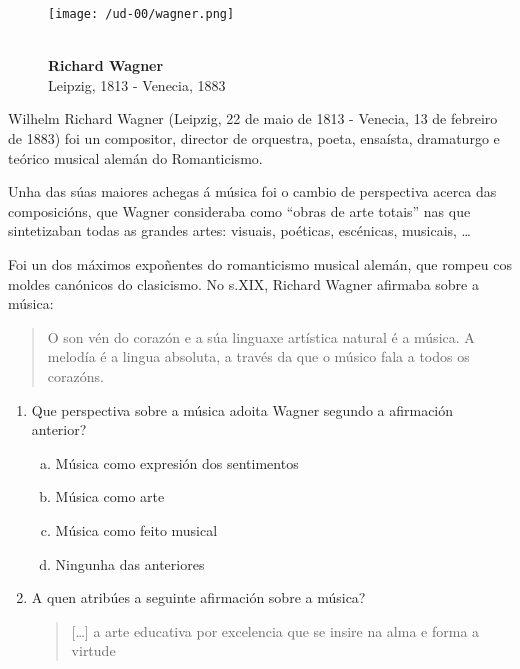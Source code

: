 \begin{ejercicio}

\begin{wrapfigure}{r}{0.30\textwidth} 
\begin{center} 
\texttt{[image: /ud-00/wagner.png]} 
\end{center} 
\caption{\\ \textbf{Richard Wagner} \\ 
Leipzig, 1813 - Venecia, 1883} 
\label{fig:descartes}
\end{wrapfigure}

Wilhelm Richard Wagner (Leipzig, 22 de maio de 1813 - Venecia, 13 de febreiro de 1883) foi un compositor, director de orquestra, poeta, ensaísta, dramaturgo e teórico musical alemán do Romanticismo.

Unha das súas maiores achegas á música foi o cambio de perspectiva acerca das composicións, que Wagner consideraba como ``obras de arte totais'' nas que sintetizaban todas as grandes artes: visuais, poéticas, escénicas, musicais, \ldots

Foi un dos máximos expoñentes do romanticismo musical alemán, que rompeu cos moldes canónicos do clasicismo. 
No s.{\scriptsize XIX}, Richard Wagner afirmaba sobre a música:

    \begin{quotation}{\small
     \noindent
     O son vén do corazón e a súa linguaxe artística natural é a música. A melodía é a lingua absoluta, a través da que o músico fala a todos os corazóns.}
    \end{quotation}
 
\begin{enumerate}[1)]
 \item \label{perspectiva-descartes}
 Que perspectiva sobre a música adoita Wagner segundo a afirmación anterior?
 \begin{enumerate}[a)]
  \item 
  Música como expresión dos sentimentos
  \item \label{sol:2}
  Música como arte
  \item 
  Música como feito musical
  \item
  Ningunha das anteriores
 \end{enumerate}
 \item \label{perpectiva-pitagoras}
 A quen atribúes a seguinte afirmación sobre a música? \dotfill
     \begin{quote}
    {%
    [\ldots] a arte educativa por excelencia que se insire na alma e forma a virtude
    }
    \end{quote}
\end{enumerate}
\end{ejercicio}

